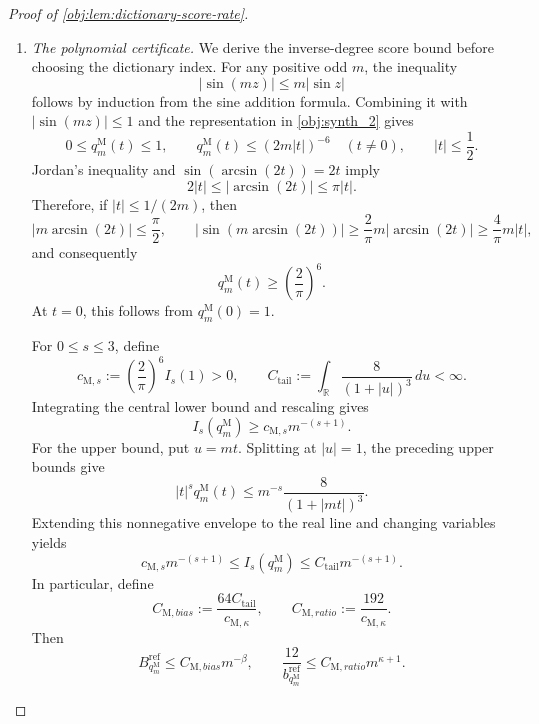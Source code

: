 \begin{proof}[Proof of \cref{obj:lem:dictionary-score-rate}]
\begin{enumerate}
\item \emph{The polynomial certificate.}
We derive the inverse-degree score bound before choosing the dictionary index. For any positive odd \(m\), the inequality
\[
|\sin(mz)|\le m|\sin z|
\]
follows by induction from the sine addition formula. Combining it with
\(|\sin(mz)|\le1\) and the representation in \cref{obj:synth_2} gives
\[
0\le q_m^{\mathrm M}(t)\le1,
\qquad
q_m^{\mathrm M}(t)\le(2m|t|)^{-6}\quad(t\ne0),
\qquad |t|\le\frac12.
\]
Jordan's inequality and \(\sin(\arcsin(2t))=2t\) imply
\[
2|t|\le|\arcsin(2t)|\le\pi|t|.
\]
Therefore, if \(|t|\le1/(2m)\), then
\[
|m\arcsin(2t)|\le\frac\pi2,
\qquad
|\sin(m\arcsin(2t))|
\ge\frac2\pi m|\arcsin(2t)|
\ge\frac4\pi m|t|,
\]
and consequently
\[
q_m^{\mathrm M}(t)\ge\left(\frac2\pi\right)^6.
\]
At \(t=0\), this follows from \(q_m^{\mathrm M}(0)=1\).

For \(0\le s\le3\), define
\[
c_{\mathrm M,s}:=\left(\frac2\pi\right)^6I_s(1)>0,
\qquad
C_{\mathrm{tail}}:=\int_{\mathbb R}\frac8{(1+|u|)^3}\,du<\infty.
\]
Integrating the central lower bound and rescaling gives
\[
I_s(q_m^{\mathrm M})\ge c_{\mathrm M,s}m^{-(s+1)}.
\]
For the upper bound, put \(u=mt\). Splitting at \(|u|=1\), the preceding upper bounds give
\[
|t|^s q_m^{\mathrm M}(t)
\le m^{-s}\frac8{(1+|mt|)^3}.
\]
Extending this nonnegative envelope to the real line and changing variables yields
\[
c_{\mathrm M,s}m^{-(s+1)}
\le I_s(q_m^{\mathrm M})
\le C_{\mathrm{tail}}m^{-(s+1)}.
\]
In particular, define
\[
C_{\mathrm M,bias}:=\frac{64C_{\mathrm{tail}}}{c_{\mathrm M,\kappa}},
\qquad
C_{\mathrm M,ratio}:=\frac{192}{c_{\mathrm M,\kappa}}.
\]
Then
\[
B_{q_m^{\mathrm M}}^{\mathrm{ref}}\le C_{\mathrm M,bias}m^{-\beta},
\qquad
\frac{12}{b_{q_m^{\mathrm M}}^{\mathrm{ref}}}
\le C_{\mathrm M,ratio}m^{\kappa+1}.
\]


\end{enumerate}
\end{proof}
